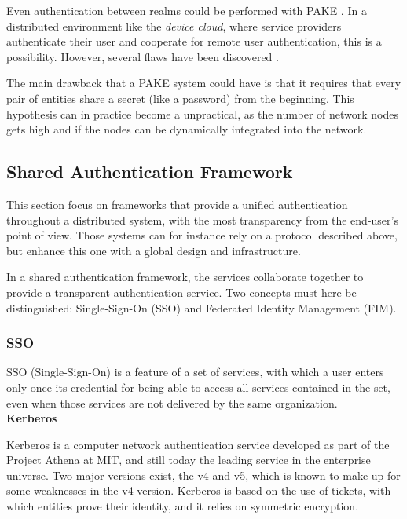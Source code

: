 Even authentication between realms could be performed with PAKE \cite{byun2002password}. In a distributed environment like the \emph{device cloud}, where service providers authenticate their user and cooperate for remote user authentication, this is a possibility. However, several flaws have been discovered \cite{Wang2004}.

The main drawback that a PAKE system could have is that it requires that every pair of entities share a secret (like a password) from the beginning. This hypothesis can in practice become a unpractical, as the number of network nodes gets high and if the nodes can be dynamically integrated into the network.


\subsection{Shared Authentication Framework}
This section focus on frameworks that provide a unified authentication throughout a distributed system, with the most transparency from the end-user's point of view. Those systems can for instance rely on a protocol described above, but enhance this one with a global design and infrastructure. 

In a shared authentication framework, the services collaborate together to provide a transparent authentication service. Two concepts must here be distinguished: Single-Sign-On (SSO) and Federated Identity Management (FIM).

\subsubsection{SSO}
\label{sec:02_SSO}
SSO (Single-Sign-On) is a feature of a set of services, with which a user enters only once its credential for being able to access all services contained in the set, even when those services are not delivered by the same organization.
\\
 
\quad \tabitem	\textbf{Kerberos}

\label{sec:02_Kerberos}
Kerberos\cite{Sundareswaran} is a computer network authentication service developed as part of the Project Athena at MIT, and still today the leading service in the enterprise universe. Two major versions exist, the v4 and v5, which is known to make up for some weaknesses in the v4 version. Kerberos is based on the use of tickets, with which entities prove their identity, and it relies on symmetric encryption.

